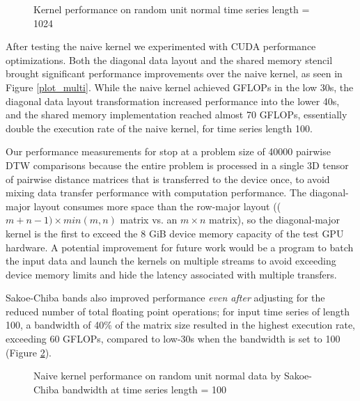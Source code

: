 \documentclass[12pt, letterpaper]{article}
\begin{document}
\begin{figure}[htbp]
    \begin{center}
        \scalebox{0.85}{}
    \end{center}
    \caption{Kernel performance on random unit normal time series length =
      1024}
    \label{plot_multi_1024}
\end{figure}


After testing the naive kernel we experimented with CUDA performance
optimizations. Both the diagonal data layout and the shared memory stencil
brought significant performance improvements over the naive kernel, as seen in
Figure \ref{plot_multi}. While the naive kernel achieved GFLOPs in the low 30s,
the diagonal data layout transformation increased performance into the lower
40s, and the shared memory implementation reached almost 70 GFLOPs, essentially
double the execution rate of the naive kernel, for time series length 100.

Our performance measurements for stop at a problem size of 40000 pairwise DTW
comparisons because the entire problem is processed in a single 3D tensor of
pairwise distance matrices that is transferred to the device once, to avoid
mixing data transfer performance with computation performance. The
diagonal-major layout consumes more space than the row-major layout (($m+n-1) \times
min(m,n)$ matrix vs. an $m \times n$ matrix), so the diagonal-major kernel is the
first to exceed the 8 GiB device memory capacity of the test GPU hardware. A
potential improvement for future work would be a program to batch the input data
and launch the kernels on multiple streams to avoid exceeding device memory
limits and hide the latency associated with multiple transfers.

Sakoe-Chiba bands also improved performance \emph{even after} adjusting for the
reduced number of total floating point operations; for input time series of
length 100, a bandwidth of 40\% of the matrix size resulted in the highest
execution rate, exceeding 60 GFLOPs, compared to low-30s when the bandwidth is
set to 100 (Figure \ref{plot_bw}).

\begin{figure}[htbp]
    \begin{center}
        \scalebox{0.85}{}
    \end{center}
    \caption{Naive kernel performance on random unit normal data by
      Sakoe-Chiba bandwidth at time series length = 100}
    \label{plot_bw}
\end{figure}
\end{document}
